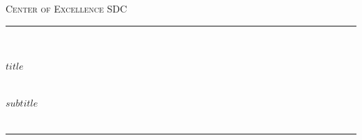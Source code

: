 %
%
%
% 


	\newcommand{\HRule}{\rule{\linewidth}{0.5mm}} %
	
	\center %
	
	
	\textsc{\LARGE Center of Excellence SDC}\\[1.5cm] %
	
	
	
	
	\HRule\\[0.4cm]
	
	{\huge\bfseries{} \rule[-0.25cm]{0pt}{0.25cm}$title$}\\[0.4cm] %
	{\large\bfseries{} $subtitle$}\\[0.4cm]
 	{\large{}}\\[0.4cm] %

	\HRule\\[1.5cm]
	
	
